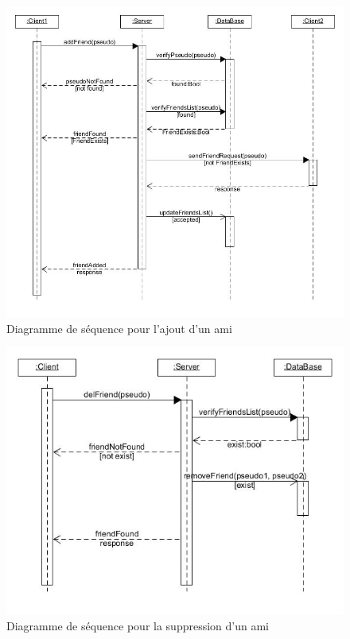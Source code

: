\documentclass[a4paper,12pt]{article}
\begin{document}
\begin{figure}[hbtp]
\centering
\includegraphics[scale=0.5]{images/add_friend.jpg}
\caption{Diagramme de séquence pour l'ajout d'un ami }
\end{figure}

\begin{figure}[hbtp]
\centering
\includegraphics[scale=0.5]{images/del_friend.jpg}
\caption{Diagramme de séquence pour la suppression d'un ami }
\end{figure}
\end{document}

